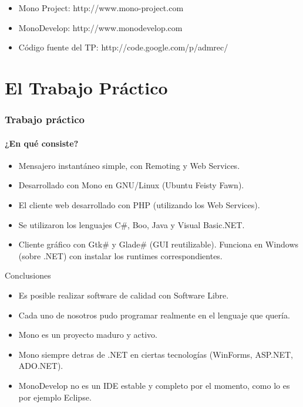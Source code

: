 \documentclass{beamer}
\begin{document}
\begin{frame}
  \begin{itemize}
    \item Mono Project: http://www.mono-project.com
    \item MonoDevelop: http://www.monodevelop.com
    \item Código fuente del TP: http://code.google.com/p/admrec/
  \end{itemize}
\end{frame}


\section{El Trabajo Práctico}

\begin{frame}
  \frametitle{Trabajo práctico}
  \framesubtitle{¿En qué consiste?}

  \begin{itemize}
    \item Mensajero instantáneo simple, con Remoting y Web Services.
    \item Desarrollado con Mono en GNU/Linux (Ubuntu Feisty Fawn).
    \item El cliente web desarrollado con PHP (utilizando los Web Services).
    \item Se utilizaron los lenguajes C\#, Boo, Java y Visual Basic.NET.
    \item Cliente gráfico con Gtk\# y Glade\# (GUI reutilizable). Funciona
      en Windows (sobre .NET) con instalar los runtimes correspondientes.
  \end{itemize}
\end{frame}

\begin{frame}{Conclusiones}
  \begin{itemize}
    \item Es posible realizar software de calidad con Software Libre.
    \item Cada uno de nosotros pudo programar realmente en el lenguaje que quería.
    \item Mono es un proyecto maduro y activo.
    \item \alert{Mono siempre detras de .NET en ciertas tecnologías (WinForms, ASP.NET, ADO.NET).}
    \item \alert{MonoDevelop no es un IDE estable y completo por el momento, como lo es por ejemplo Eclipse.}
  \end{itemize}
\end{frame}
\end{document}
